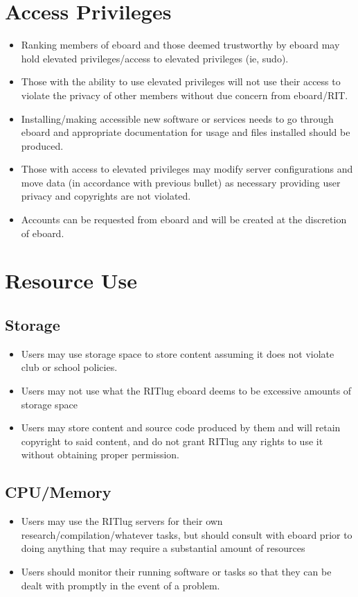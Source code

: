 



\section{Access Privileges}

\begin{itemize}
\item Ranking members of eboard and those deemed trustworthy by eboard may hold elevated privileges/access to elevated privileges (ie, sudo).
\item Those with the ability to use elevated privileges will not use their access to violate the privacy of other members without due concern from eboard/RIT.
\item Installing/making accessible new software or services needs to go through eboard and appropriate documentation for usage and files installed should be produced.
\item Those with access to elevated privileges may modify server configurations and move data (in accordance with previous bullet) as necessary providing user privacy and copyrights are not violated.
\item Accounts can be requested from eboard and will be created at the discretion of eboard.
\end{itemize}

\section{Resource Use}

\subsection{Storage}
\begin{itemize}
\item Users may use storage space to store content assuming it does not violate club or school policies.
\item Users may not use what the RITlug eboard deems to be excessive amounts of storage space
\item Users may store content and source code produced by them and will retain copyright to said content, and do not grant RITlug any rights to use it without obtaining proper permission.
\end{itemize}

\subsection{CPU/Memory}
\begin{itemize}
\item Users may use the RITlug servers for their own research/compilation/whatever tasks, but should consult with eboard prior to doing anything that may require a substantial amount of resources
\item Users should monitor their running software or tasks so that they can be dealt with promptly in the event of a problem.
\end{itemize}

